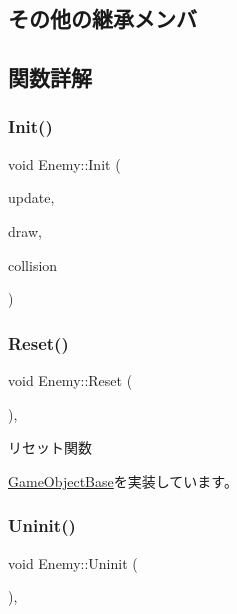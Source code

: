 \subsection*{その他の継承メンバ}


\subsection{関数詳解}
\mbox{\label{class_enemy_a678f73f8af13e1bc55be3fdad2608399}} 
\subsubsection{\texorpdfstring{Init()}{Init()}}
{\footnotesize\ttfamily void Enemy\+::\+Init (\begin{DoxyParamCaption}\item[{\mbox{\hyperlink{class_update_base}{Update\+Base}} $\ast$}]{update,  }\item[{\mbox{\hyperlink{class_draw_base}{Draw\+Base}} $\ast$}]{draw,  }\item[{\mbox{\hyperlink{class_collision_base}{Collision\+Base}} $\ast$}]{collision }\end{DoxyParamCaption})}

\mbox{\label{class_enemy_ab86571061e7fcabcf8c646b1abad5581}} 
\subsubsection{\texorpdfstring{Reset()}{Reset()}}
{\footnotesize\ttfamily void Enemy\+::\+Reset (\begin{DoxyParamCaption}{ }\end{DoxyParamCaption})\hspace{0.3cm}{\ttfamily [override]}, {\ttfamily [virtual]}}



リセット関数 



\mbox{\hyperlink{class_game_object_base_a85c59554f734bcb09f1a1e18d9517dce}{Game\+Object\+Base}}を実装しています。

\mbox{\label{class_enemy_a9aeaa757abdf0c37fd67c4ce5aed6962}} 
\subsubsection{\texorpdfstring{Uninit()}{Uninit()}}
{\footnotesize\ttfamily void Enemy\+::\+Uninit (\begin{DoxyParamCaption}{ }\end{DoxyParamCaption})\hspace{0.3cm}{\ttfamily [override]}, {\ttfamily [virtual]}}




